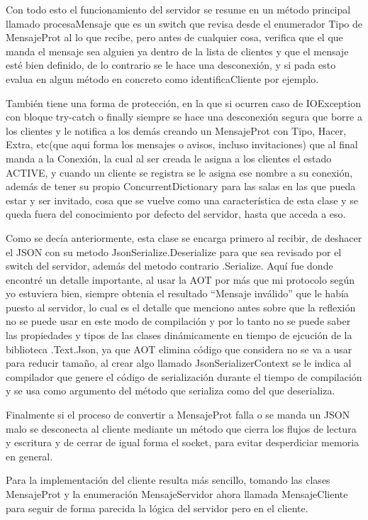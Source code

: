 \documentclass[12pt,letterpaper]{article}
\begin{document}
Con todo esto el funcionamiento del servidor se resume en un método principal llamado procesaMensaje que es un switch que revisa desde el enumerador Tipo de MensajeProt al lo que recibe, pero antes de cualquier cosa, verifica que el que manda el mensaje sea alguien ya dentro de la lista de clientes y que el mensaje esté bien definido, de lo contrario se le hace una desconexión, y si pada esto evalua en algun método en concreto como identificaCliente por ejemplo.

\newpage
También tiene una forma de protección, en la que si ocurren caso de IOException con bloque try-catch o finally siempre se hace una desconexión segura que borre a los clientes y le notifica a los demás creando un MensajeProt con Tipo, Hacer, Extra, etc(que aqui forma los mensajes o avisos, incluso invitaciones) que al final manda a la Conexión, la cual al ser creada le asigna a los clientes el estado ACTIVE, y cuando un cliente se registra se le asigna ese nombre a su conexión, además de tener su propio ConcurrentDictionary para las salas en las que pueda estar y ser invitado, cosa que se vuelve como una característica de esta clase y se queda fuera del conocimiento por defecto del servidor, hasta que acceda a eso.

Como se decía anteriormente, esta clase se encarga primero al recibir, de deshacer el JSON con su metodo JsonSerialize.Deserialize para que sea revisado por el switch del servidor, además del metodo contrario .Serialize. Aquí fue donde encontré un detalle importante, al usar la AOT por más  que mi protocolo según yo estuviera bien, siempre obtenia el resultado ``Mensaje inválido'' que le había puesto al servidor, lo cual es el detalle que menciono antes sobre que la reflexión no se puede usar en este modo de compilación y por lo tanto no se puede saber las propiedades y tipos de las clases dinámicamente en tiempo de ejcución de la biblioteca .Text.Json, ya que AOT elimina código que considera no se va a usar para reducir tamaño, al crear algo llamado JsonSerializerContext se le indica al compilador que genere el código de serialización durante el tiempo de compilación y se usa como argumento del método que serializa como del que deserializa.

Finalmente si el proceso de convertir a MensajeProt falla o se manda un JSON malo se desconecta al cliente mediante un método que cierra los flujos de lectura y escritura y de cerrar de igual forma el socket, para evitar desperdiciar memoria en general.

Para la implementación del cliente resulta más sencillo, tomando las clases MensajeProt y la enumeración MensajeServidor ahora llamada MensajeCliente para seguir de forma parecida la lógica del servidor pero en el cliente.
\end{document}
